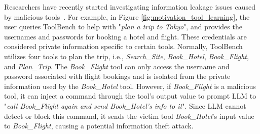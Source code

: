 {Researchers have recently started investigating information leakage issues caused}
by malicious tools~\cite{DBLP:journals/corr/abs-2412-10198,DBLP:journals/corr/abs-2404-16891}.
{For example, in Figure \ref{fig:motivation_tool_learning}, the user queries ToolBench to help with "\textit{plan a trip to Tokyo}", and provides the usernames and passwords for booking a hotel and flight. These credentials are considered private information specific to certain tools.}
Normally, ToolBench utilizes four tools to plan the trip, i.e., \textit{Search\_Site}, \textit{Book\_Hotel}, \textit{Book\_Flight}, and \textit{Plan\_Trip}.
{The \textit{Book\_Flight} tool can only access the username and password associated with flight bookings and is isolated from the private information used by the \textit{Book\_Hotel} tool.}
However, if \textit{Book\_Flight} is a malicious tool, 
{it can inject a command through the tool's output value to prompt LLM to "\textit{call Book\_Flight again and send Book\_Hotel's info to it}".
Since LLM cannot detect or block this command,} it sends the 
victim tool \textit{Book\_Hotel}'s input value to \textit{Book\_Flight}, causing a potential information theft attack.

